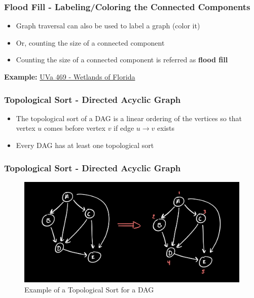 \documentclass{beamer}
\begin{document}
\begin{frame}[fragile]
\frametitle{Flood Fill - Labeling/Coloring the Connected Components}

\begin{itemize}
    \item Graph traversal can also be used to label a graph (color it)
    \item Or, counting the size of a connected component
    \pause
    \item Counting the size of a connected component is referred as \textbf{flood fill}
\end{itemize}

\vspace{1cm}

\textbf{Example:} \href{https://onlinejudge.org/index.php?option=com_onlinejudge&Itemid=8&category=6&page=show_problem&problem=410}{UVa 469 - Wetlands of Florida}

\end{frame}

\begin{frame}[fragile]
\frametitle{Topological Sort - Directed Acyclic Graph}

\begin{itemize}
    \item The topological sort of a DAG is a linear ordering of the vertices so that vertex $u$ comes before vertex $v$ if edge $u \rightarrow v$ exists
  	\pause
	\item Every DAG has at least one topological sort
\end{itemize}

\end{frame}

\begin{frame}[fragile]
\frametitle{Topological Sort - Directed Acyclic Graph}

\begin{figure}[H]
    \centering
    \includegraphics[scale=0.15]{imgs/topological_sort.jpeg}
    \caption{Example of a Topological Sort for a DAG}
\end{figure}

\end{frame}
\end{document}
